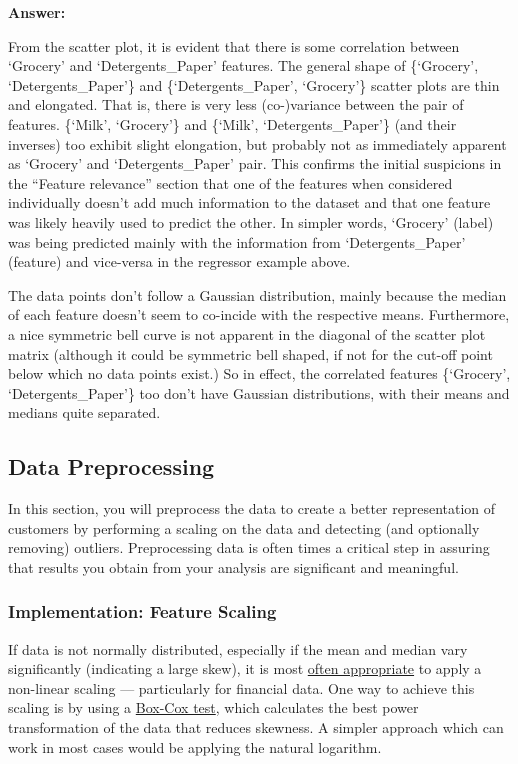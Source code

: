 \documentclass{article}
\begin{document}
    \textbf{Answer:}

From the scatter plot, it is evident that there is some correlation
between `Grocery' and `Detergents\_Paper' features. The general shape of
\{`Grocery', `Detergents\_Paper'\} and \{`Detergents\_Paper',
`Grocery'\} scatter plots are thin and elongated. That is, there is very
less (co-)variance between the pair of features. \{`Milk', `Grocery'\}
and \{`Milk', `Detergents\_Paper'\} (and their inverses) too exhibit
slight elongation, but probably not as immediately apparent as `Grocery'
and `Detergents\_Paper' pair. This confirms the initial suspicions in
the ``Feature relevance'' section that one of the features when
considered individually doesn't add much information to the dataset and
that one feature was likely heavily used to predict the other. In
simpler words, `Grocery' (label) was being predicted mainly with the
information from `Detergents\_Paper' (feature) and vice-versa in the
regressor example above.

The data points don't follow a Gaussian distribution, mainly because the
median of each feature doesn't seem to co-incide with the respective
means. Furthermore, a nice symmetric bell curve is not apparent in the
diagonal of the scatter plot matrix (although it could be symmetric bell
shaped, if not for the cut-off point below which no data points exist.)
So in effect, the correlated features \{`Grocery', `Detergents\_Paper'\}
too don't have Gaussian distributions, with their means and medians
quite separated.

    \subsection{Data Preprocessing}\label{data-preprocessing}

In this section, you will preprocess the data to create a better
representation of customers by performing a scaling on the data and
detecting (and optionally removing) outliers. Preprocessing data is
often times a critical step in assuring that results you obtain from
your analysis are significant and meaningful.

    \subsubsection{Implementation: Feature
Scaling}\label{implementation-feature-scaling}

If data is not normally distributed, especially if the mean and median
vary significantly (indicating a large skew), it is most
\href{http://econbrowser.com/archives/2014/02/use-of-logarithms-in-economics}{often
appropriate} to apply a non-linear scaling --- particularly for
financial data. One way to achieve this scaling is by using a
\href{http://scipy.github.io/devdocs/generated/scipy.stats.boxcox.html}{Box-Cox
test}, which calculates the best power transformation of the data that
reduces skewness. A simpler approach which can work in most cases would
be applying the natural logarithm.
\end{document}
